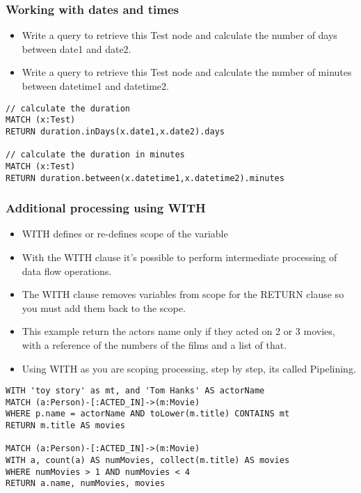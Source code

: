 \begin{frame}[fragile]\frametitle{Working with dates and times}

\begin{itemize}
\item Write a query to retrieve this Test node and calculate the number of days between date1 and date2.
\item Write a query to retrieve this Test node and calculate the number of minutes between datetime1 and datetime2.
\end{itemize}

\begin{lstlisting}
// calculate the duration
MATCH (x:Test)
RETURN duration.inDays(x.date1,x.date2).days

// calculate the duration in minutes
MATCH (x:Test)
RETURN duration.between(x.datetime1,x.datetime2).minutes
\end{lstlisting}


\end{frame}


\begin{frame}[fragile]\frametitle{Additional processing using WITH}

\begin{itemize}
\item WITH defines or re-defines scope of the variable
\item With the WITH clause it's possible to perform intermediate processing of data flow operations.
\item The WITH clause removes variables from scope for the RETURN clause so you must add them back to the scope.
\item This example return the actors name only if they acted on 2 or 3 movies, with a reference of the numbers of the films and a list of that.
\item Using WITH as you are scoping processing, step by step, its called Pipelining.
\end{itemize}

\begin{lstlisting}
WITH 'toy story' as mt, and 'Tom Hanks' AS actorName
MATCH (a:Person)-[:ACTED_IN]->(m:Movie)
WHERE p.name = actorName AND toLower(m.title) CONTAINS mt
RETURN m.title AS movies

MATCH (a:Person)-[:ACTED_IN]->(m:Movie)
WITH a, count(a) AS numMovies, collect(m.title) AS movies
WHERE numMovies > 1 AND numMovies < 4
RETURN a.name, numMovies, movies
\end{lstlisting}

\end{frame}

